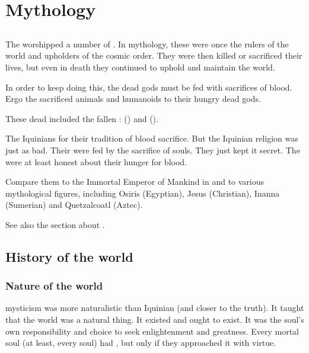 \section{Mythology}









\subsection{\Dragons}
The \Ortaicans worshipped a number of \dragons. 
In mythology, these \dragons were once the rulers of the world and upholders of the cosmic order. 
They were then killed or sacrificed their lives, but even in death they continued to uphold and maintain the world. 

In order to keep doing this, the dead \dragon gods must be fed with sacrifices of blood. 
Ergo the \Ortaicans sacrificed animals and humanoids to their hungry dead gods. 

These dead \dragons included the fallen \Nechsains: 
 (\Sethicus) and  (\Nexagglachel). 

The Iquinians  for their tradition of blood sacrifice. 
But the Iquinian religion {was just as bad}. 
Their \sephiroth were fed by the sacrifice of souls.
They just kept it secret. 
The \Ortaicans were at least honest about their hunger for blood. 

Compare them to the Immortal Emperor of Mankind in \cite{RPG:Warhammer40000} and to various mythological figures, including Osiris (Egyptian), Jesus (Christian), Inanna (Sumerian) and Quetzalcoatl (Aztec). 

See also the section about . 









\subsection{History of the world}





\subsubsection{Nature of the world}
\Ortaican mysticism was more naturalistic than Iquinian (and closer to the truth). 
It taught that the world was a natural thing. 
It existed and ought to exist. 
It was the soul's own responsibility and choice to seek enlightenment and greatness. 
Every mortal soul (at least, every \scathaese soul) had , but only if they approached it with virtue.


